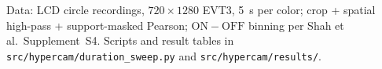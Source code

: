 \documentclass[11pt,a4paper]{article}
\begin{document}
\medskip
\textsf{\small Data: LCD circle recordings, $720\times1280$ EVT3, 5~s per color; crop +
spatial high-pass + support-masked Pearson; $\mathrm{ON}-\mathrm{OFF}$ binning per Shah et
al.\ Supplement~S4. Scripts and result tables in
\texttt{src/hypercam/}\allowbreak\texttt{duration\_sweep.py} and
\texttt{src/hypercam/}\allowbreak\texttt{results/}.}
\end{document}
